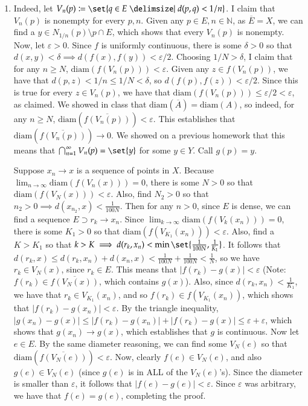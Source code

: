 \documentclass[12pt]{article}
\def\mbb#1{\mathbb{#1}}
\def\bN{\mbb{N}}
\def \ve{\varepsilon}
\theoremstyle{definition}
\theoremstyle{remark}
\begin{document}
\begin{enumerate}[leftmargin=\labelsep]
		\item Indeed, let $V_n(p) \coloneqq \set{q \in E \given d(p, q) < 1/n}$. I claim that $V_n(p)$ is nonempty for every $p, n$. Given any $p \in E, n \in \bN$, as $\overline{E} = X$, we can find a $y \in N_{1/n}(p) \setminus p \cap E$, which shows that every $V_n(p)$ is nonempty. Now, let $\ve > 0$. Since $f$ is uniformly continuous, there is some $\delta > 0$ so that $d(x, y) < \delta \implies d(f(x), f(y)) < \ve/2$. Choosing $1/N > \delta$, I claim that for any $n \geq N$, $\mathrm{diam}(f(V_n(p))) < \ve$. Given any $z \in f(V_n(p))$, we have that $d(p, z) < 1/n \leq 1/N < \delta$, so $d(f(p), f(z)) < \ve/2$. Since this is true for every $z \in V_n(p)$, we have that $\mathrm{diam}(f(V_n(p))) \leq \ve/2 < \ve$, as claimed. We showed in class that $\mathrm{diam}(\overline{A}) = \mathrm{diam}(A)$, so indeed, for any $n \geq N$, $\mathrm{diam}(\overline{f(V_n(p))}) < \ve$. This establishes that $\mathrm{diam}(\overline{f(V_n(p))}) \to 0$. We showed on a previous homework that this means that $\bigcap_{n=1}^\infty V_n(p) = \set{y}$ for some $y \in Y$. Call $g(p) = y$.
		
		
		 Suppose $x_n \to x$ is a sequence of points in $X$. Because $\lim_{n \to \infty} \mathrm{diam}(f(V_n(x))) = 0$, there is some $N > 0$ so that $\mathrm{diam}(f(V_N(x))) < \ve$. Also, find $N_2 > 0$ so that $n_2 > 0 \implies d(x_{n_2}, x) < \frac1{100N}$. Then for any $n > 0$, since $E$ is dense, we can find a sequence $E \supset r_k \to x_n$. Since $\lim_{k \to \infty} \mathrm{diam}(f(V_k(x_n))) = 0$, there is some $K_1 > 0$ so that $\mathrm{diam}(f(V_{K_1}(x_n))) < \ve$. Also, find a $K > K_1$ so that $k > K \implies d(r_k, x_n) < \min\set{\frac{1}{100N}, \frac{1}{K_1}}$. It follows that $d(r_k, x) \leq d(r_k, x_n) + d(x_n, x) < \frac{1}{100N} + \frac{1}{100N} < \frac{1}{N}$, so we have $r_k \in V_N(x)$, since $r_k \in E$. This means that $|f(r_k) - g(x)| < \ve$ (Note: $f(r_k) \in \overline{f(V_N(x))}$, which contains $g(x)$). Also, since $d(r_k, x_n) < \frac{1}{K_1}$, we have that $r_k \in V_{K_1}(x_n)$, and so $f(r_k) \in f(V_{K_1}(x_n))$, which shows that $|f(r_k) - g(x_n)| < \ve$. By the triangle inequality, $|g(x_n)-g(x)| \leq |f(r_k)-g(x_n)| + |f(r_k)-g(x)| \leq \ve + \ve$, which shows that $g(x_n) \to g(x)$, which establishes that $g$ is continuous. Now let $e \in E$. By the same diameter reasoning, we can find some $V_N(e)$ so that $\mathrm{diam}(\overline{f(V_N(e))}) < \ve$. Now, clearly $f(e) \in V_N(e)$, and also $g(e) \in V_N(e)$ (since $g(e)$ is in ALL of the $V_N(e)$'s). Since the diameter is smaller than $\ve$, it follows that $|f(e) - g(e)| < \ve$. Since $\ve$ was arbitrary, we have that $f(e) = g(e)$, completing the proof.
		 

\end{enumerate}
\end{document}
